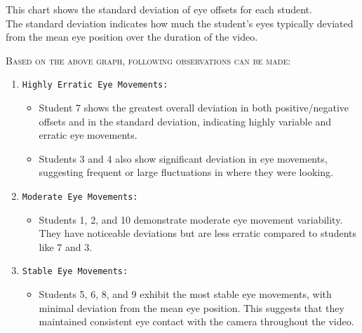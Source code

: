 \documentclass{article}
\begin{document}
This chart shows the standard deviation of eye offsets for each student.\\
The standard deviation indicates how much the student's eyes typically deviated from the mean eye position over the duration of the video.


\textsc{Based on the above graph, following observations can be made:}
\begin{enumerate}
    \item \texttt{Highly Erratic Eye Movements:} {
        \begin{itemize}
            \item {Student 7 shows the greatest overall deviation in both positive/negative offsets and in the standard deviation, indicating highly variable and erratic eye movements.}
            \item {Students 3 and 4 also show significant deviation in eye movements, suggesting frequent or large fluctuations in where they were looking.
            }
        \end{itemize}
    }
    \item \texttt{Moderate Eye Movements:} {
        \begin{itemize}
            \item {Students 1, 2, and 10 demonstrate moderate eye movement variability. They have noticeable deviations but are less erratic compared to students like 7 and 3.
            }
        \end{itemize}
    }
    \item \texttt{Stable Eye Movements:} {
        \begin{itemize}
            \item {Students 5, 6, 8, and 9 exhibit the most stable eye movements, with minimal deviation from the mean eye position. This suggests that they maintained consistent eye contact with the camera throughout the video.
            }
        \end{itemize}
    }
\end{enumerate}






\end{document}
